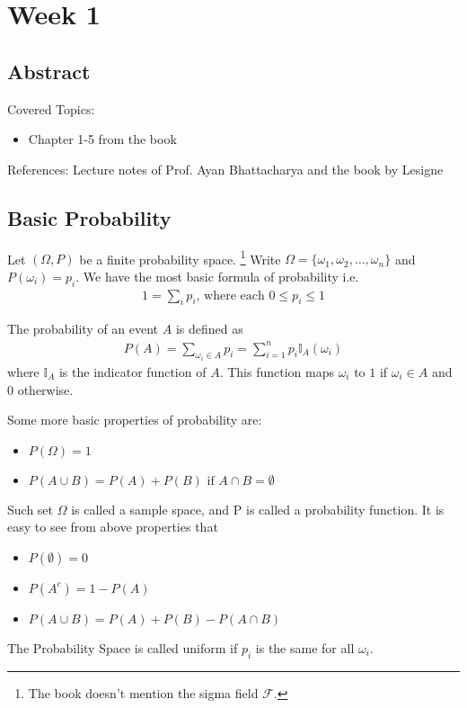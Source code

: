 \chapter{Week 1}
\label{chap:Week1}
\section*{Abstract}
Covered Topics:
    \begin{itemize}
        \item Chapter 1-5 from the book
    \end{itemize}
    References: Lecture notes of Prof. Ayan Bhattacharya \cite{Notes2024} and the book by Lesigne \cite{lesigne2005heads}
\section{Basic Probability}
Let $(\Omega,P)$ be a finite probability space. \footnote{The book doesn't mention the sigma field $\mathscr{F}$.} 
Write $\Omega=\{\omega_1,\omega_2,\ldots,\omega_n\}$ and $P(\omega_i)=p_i$. We have the most basic formula of probability i.e. 
\begin{align}
    1=\sum_i{p_i} \text{, where each } 0 \leq p_i \leq 1
\end{align}
\begin{definition}
    The probability of an event $A$ is defined as 
    \begin{align}
        P(A)=\sum_{\omega_i \in A}{p_i}=\sum_{i=1}^{n}{p_i \mathbb{I}_A(\omega_i)}
    \end{align}
    where $\mathbb{I}_A$ is the indicator function of $A$. This function maps $\omega_i$ to $1$ if $\omega_i \in A$ and $0$ otherwise.
\end{definition}
Some more basic properties of probability are:
\begin{itemize}
    \item $P(\Omega)=1$
    \item $P(A \cup B)=P(A)+P(B) \text{ if } A \cap B=\emptyset$
\end{itemize}
Such set $\Omega$ is called a sample space, and P is called a probability function. It is easy to see from above properties that
\begin{itemize}
    \item $P(\emptyset)=0$
    \item $P(A^c)=1-P(A)$
    \item $P(A \cup B)=P(A)+P(B)-P(A \cap B)$
\end{itemize}
\begin{definition}
    The Probability Space is called uniform if $p_i$ is the same for all $\omega_i$.
\end{definition}
